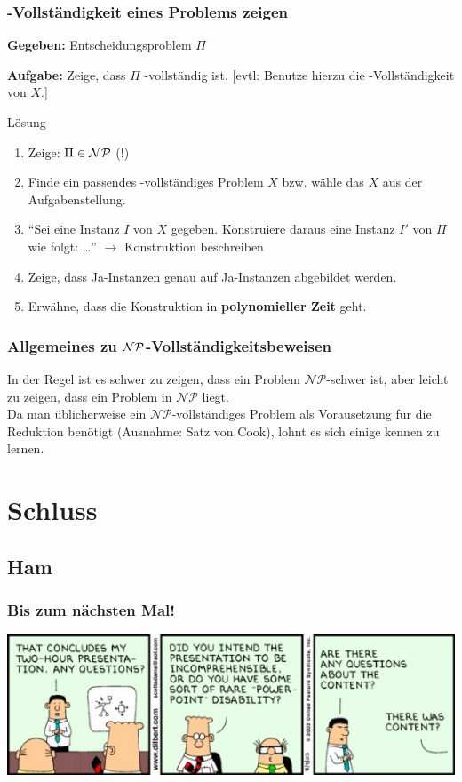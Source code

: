 
\begin{frame}
	\frametitle{\recipe \classNP{}-Vollständigkeit eines Problems zeigen}
	
	\textbf{Gegeben:} Entscheidungsproblem $\Pi$
	
	\textbf{Aufgabe:} Zeige, dass $\Pi$ \classNP{}-vollständig ist. [evtl: Benutze hierzu die \classNP{}-Vollständigkeit von $X$.]
	
	\ducttape{.5cm}

	\begin{block}{Lösung}	
	\begin{enumerate}
		\item Zeige: $\Pi \in \mathcal{NP}$ (!)
		\item Finde ein passendes \classNP{}-vollständiges Problem $X$ bzw. wähle das $X$ aus der Aufgabenstellung.
		\item "`Sei eine Instanz $I$ von $X$ gegeben. Konstruiere daraus eine Instanz $I'$ von $\Pi$ wie folgt: …"' $\rightarrow$ Konstruktion beschreiben
		\item Zeige, dass Ja-Instanzen genau auf Ja-Instanzen abgebildet werden.
		\item Erwähne, dass die Konstruktion in \textbf{polynomieller Zeit} geht.
	\end{enumerate}
		
	\end{block}
	
\end{frame}

\begin{frame}
\frametitle{Allgemeines zu $\mathcal{NP}$-Vollständigkeitsbeweisen}
In der Regel ist es schwer zu zeigen, dass ein Problem $\mathcal{NP}$-schwer ist, aber leicht zu zeigen, dass ein Problem in $\mathcal{NP}$ liegt.\\[8pt]
Da man üblicherweise ein $\mathcal{NP}$-vollständiges Problem als Vorausetzung für die Reduktion benötigt (Ausnahme: Satz von Cook), lohnt es sich einige kennen zu lernen.
\end{frame}

\section{Schluss}
\subsection{Ham}

\begin{frame}
	\frametitle{Bis zum nächsten Mal!}
	
	\begin{center}
		\includegraphics[width=\textwidth]{images/221_strip.jpg}
	\end{center}
\end{frame}


